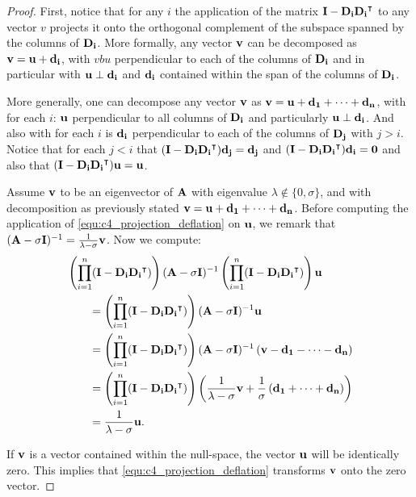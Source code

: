 \begin{proof}
    First, notice that for any $i$ the application of the matrix $\vb{I} - \vb{D_i}{\vb{D_i}}^\intercal$ to any vector $v$ projects it onto the orthogonal complement of the subspace spanned by the columns of $\vb{D_i}$. More formally, any vector $\vb{v}$ can be decomposed as $\vb{v} = \vb{u} + \vb{d_i}$, with $vb{u}$ perpendicular to each of the columns of $\vb{D_i}$ and in particular with $\vb{u} \perp \vb{d_i}$ and $\vb{d_i}$ contained within the span of the columns of $\vb{D_i}$.

    More generally, one can decompose any vector $\vb{v}$ as $\vb{v} = \vb{u} + \vb{d_1} + \dots + \vb{d_n}$, with for each $i$: $\vb{u}$ perpendicular to all columns of $\vb{D_i}$ and particularly $\vb{u} \perp \vb{d_i}$. And also with for each $i$ is $\vb{d_i}$ perpendicular to each of the columns of $\vb{D_j}$ with $j > i$. Notice that for each $j < i$ that $(\vb{I} - \vb{D_i}{\vb{D_i}}^\intercal)\vb{d_j} = \vb{d_j}$ and $(\vb{I} - \vb{D_i}{\vb{D_i}}^\intercal)\vb{d_i} = \vb{0}$ and also that $(\vb{I} - \vb{D_i}{\vb{D_i}}^\intercal)\vb{u} = \vb{u}$.

    Assume $\vb{v}$ to be an eigenvector of $\vb{A}$ with eigenvalue $\lambda \notin \{0, \sigma\}$, and with decomposition as previously stated $\vb{v} = \vb{u} + \vb{d_1} + \dots + \vb{d_n}$. Before computing the application of \eqref{equ:c4_projection_deflation} on $\vb{u}$, we remark that $(\vb{A}-\sigma \vb{I})^{-1} = \frac{1}{\lambda - \sigma}\vb{v}$. Now we compute:
    \begin{align*}
         & \left(\prod_{i=1}^{n}(\vb{I} - \vb{D_i}{\vb{D_i}}^\intercal)\right) (\vb{A} - \sigma \vb{I})^{-1} \left(\prod_{i=1}^{n}(\vb{I} - \vb{D_i}{\vb{D_i}}^\intercal)\right) \vb{u}          \\
         & \qquad = \left(\prod_{i=1}^{n}(\vb{I} - \vb{D_i}{\vb{D_i}}^\intercal)\right) (\vb{A} - \sigma \vb{I})^{-1} \vb{u}                                                                     \\
         & \qquad = \left(\prod_{i=1}^{n}(\vb{I} - \vb{D_i}{\vb{D_i}}^\intercal)\right) (\vb{A} - \sigma \vb{I})^{-1} \left(\vb{v} - \vb{d_1} - \dots - \vb{d_n}\right)                          \\
         & \qquad = \left(\prod_{i=1}^{n}(\vb{I} - \vb{D_i}{\vb{D_i}}^\intercal)\right) \left(\frac{1}{\lambda - \sigma}\vb{v} + \frac{1}{\sigma}\left(\vb{d_1} + \dots + \vb{d_n}\right)\right) \\
         & \qquad = \frac{1}{\lambda - \sigma}\vb{u} \text{.}
    \end{align*}

    If $\vb{v}$ is a vector contained within the null-space, the vector $\vb{u}$ will be identically zero. This implies that \eqref{equ:c4_projection_deflation} transforms $\vb{v}$ onto the zero vector.
\end{proof}

